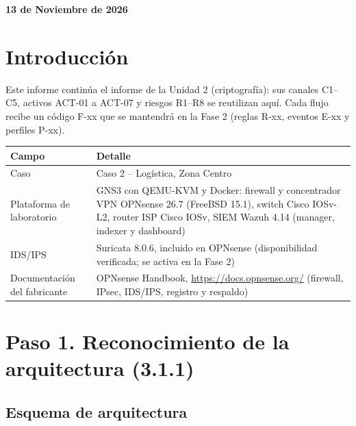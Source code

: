 \documentclass[11pt,a4paper]{article}
\newcommand{\docFecha}{13 de Noviembre de 2026}
\begin{document}
\vspace{1.5cm}
\begin{center}
  \textbf{\docFecha}
\end{center}

\clearpage
\restoregeometry
\pagestyle{mainpage}

\vspace{1cm}
\tableofcontents
\newpage

\section*{Introducción}

Este informe continúa el informe de la Unidad 2 (criptografía): sus canales C1–C5, activos ACT-01 a ACT-07 y riesgos R1–R8 se reutilizan aquí. Cada flujo recibe un código F-xx que se mantendrá en la Fase 2 (reglas R-xx, eventos E-xx y perfiles P-xx).

\begin{table}[H]
\centering\small
\begin{tabular}{@{}P{4.2cm}P{10.2cm}@{}}
\toprule
\textbf{Campo} & \textbf{Detalle} \\ \midrule
Caso & Caso 2 – Logística, Zona Centro \\
Plataforma de laboratorio & GNS3 con QEMU-KVM y Docker: firewall y concentrador VPN OPNsense 26.7 (FreeBSD 15.1), switch Cisco IOSv-L2, router ISP Cisco IOSv, SIEM Wazuh 4.14 (manager, indexer y dashboard) \\
IDS/IPS & Suricata 8.0.6, incluido en OPNsense (disponibilidad verificada; se activa en la Fase 2) \\
Documentación del fabricante & OPNsense Handbook, \url{https://docs.opnsense.org/} (firewall, IPsec, IDS/IPS, registro y respaldo) \\ \bottomrule
\end{tabular}
\end{table}

\newpage
\section{Paso 1. Reconocimiento de la arquitectura (3.1.1)}

\subsection{Esquema de arquitectura}
\end{document}
